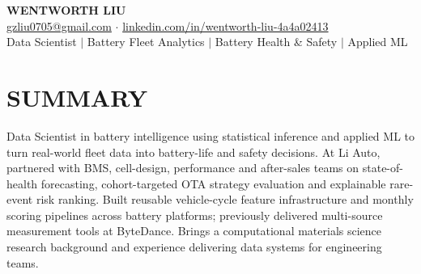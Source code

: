 \documentclass[a4paper,10pt]{article}
\begin{document}
\fontsize{9.8pt}{11.2pt}\selectfont

\begin{center}
{\Large\bfseries WENTWORTH LIU}\\[2pt]
{\small \href{mailto:gzliu0705@gmail.com}{gzliu0705@gmail.com} \;$\cdot$\; \href{https://www.linkedin.com/in/wentworth-liu-4a4a02413}{linkedin.com/in/wentworth-liu-4a4a02413}}\\[2pt]
{\small Data Scientist \;$\vert$\; Battery Fleet Analytics \;$\vert$\; Battery Health \& Safety \;$\vert$\; Applied ML}
\end{center}
\vspace{-4pt}

\section{SUMMARY}
Data Scientist in battery intelligence using statistical inference and applied ML to turn real-world fleet data into battery-life and safety decisions. At Li Auto, partnered with BMS, cell-design, performance and after-sales teams on state-of-health forecasting, cohort-targeted OTA strategy evaluation and explainable rare-event risk ranking. Built reusable vehicle-cycle feature infrastructure and monthly scoring pipelines across battery platforms; previously delivered multi-source measurement tools at ByteDance. Brings a computational materials science research background and experience delivering data systems for engineering teams.
\end{document}
